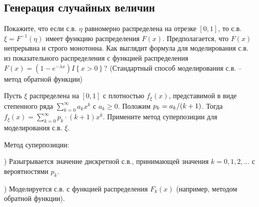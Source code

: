 \begin{comment}
\begin{problem}

Если $X$ -- с.в., имеющая стандартное нормальное распределение, то $X^{-2} $ имеет устойчивую плотность:
\[\frac{1}{\sqrt{2\pi } } e^{-\frac{1}{2x} } x^{-\frac{3}{2} } , x>0.\] 
Используя это, покажите, что если $X$ и $Y$ -- независимые нормально распределенные с.в. с нулевым математическим ожиданием и дисперсиями $\sigma _{1}^{2} $ и $\sigma _{2}^{2} $, то величина $Z=\frac{XY}{\sqrt{X^{2} +Y^{2} } } $ нормально распределена с дисперсией $\sigma _{3}^{2} $, такой, что $\frac{1}{\sigma _{3}^{2} } =\frac{1}{\sigma _{1}^{2} } +\frac{1}{\sigma _{2}^{2} } $ (Л.Шепп).

\end{problem}
\end{comment}

\subsection{Генерация случайных величин}

\begin{problem}
Покажите, что если с.в. $\eta $ равномерно распределена на отрезке $\left[0,1\right]$, то с.в. $\xi =F^{-1} \left(\eta \right)$ имеет функцию распределения $F\left(x\right)$. Предполагается, что $F\left(x\right)$ непрерывна и строго монотонна. Как выглядит формула для моделирования с.в. из показательного распределения с функцией распределения $F\left(x\right)=\left(1-e^{-\lambda x} \right)I\left\{x>0\right\}$? (Стандартный способ моделирования с.в. -- метод обратной функции)
\end{problem}

\begin{problem}

Пусть $\xi $ распределена на $\left[0,1\right]$ с плотностью $f_{\xi } (x)$, представимой в виде степенного ряда $\sum _{k=0}^{\infty }a_{k} x^{k}  $ с $a_{k} \ge 0$. Положим $p_{k} ={a_{k} \mathord{\left/ {\vphantom {a_{k}  (k+1)}} \right. \kern-\nulldelimiterspace} (k+1)} $. Тогда $f_{\xi } (x)=\sum _{k=0}^{\infty }p_{k} \cdot (k+1)x^{k}  $. Примените метод суперпозиции для моделирования с.в. $\xi $.

\begin{ordre}
Метод суперпозиции:

) Разыгрывается значение дискретной с.в., принимающей значения $k=0,1,2,...$ с вероятностями $p_{k} $.

) Моделируется с.в. с функцией распределения $F_{k} (x)$ (например, методом обратной функции).

\end{ordre}

\end{problem}

